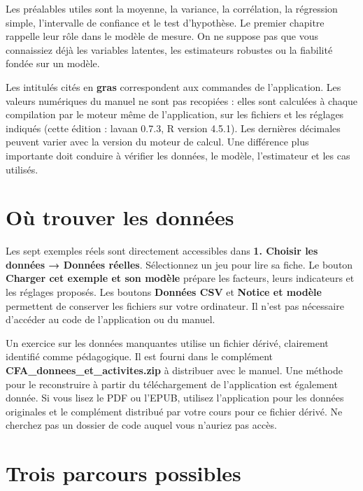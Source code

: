 \documentclass[
  french,
  11pt,
  a4paper,
  DIV=11,
  numbers=noendperiod]{scrreprt}
\begin{document}
Les préalables utiles sont la moyenne, la variance, la corrélation, la
régression simple, l'intervalle de confiance et le test d'hypothèse. Le
premier chapitre rappelle leur rôle dans le modèle de mesure. On ne
suppose pas que vous connaissiez déjà les variables latentes, les
estimateurs robustes ou la fiabilité fondée sur un modèle.

Les intitulés cités en \textbf{gras} correspondent aux commandes de
l'application. Les valeurs numériques du manuel ne sont pas recopiées :
elles sont calculées à chaque compilation par le moteur même de
l'application, sur les fichiers et les réglages indiqués (cette édition
: lavaan 0.7.3, R version 4.5.1). Les dernières décimales peuvent varier
avec la version du moteur de calcul. Une différence plus importante doit
conduire à vérifier les données, le modèle, l'estimateur et les cas
utilisés.

\section*{Où trouver les données}\label{ouxf9-trouver-les-donnuxe9es}


Les sept exemples réels sont directement accessibles dans \textbf{1.
Choisir les données → Données réelles}. Sélectionnez un jeu pour lire sa
fiche. Le bouton \textbf{Charger cet exemple et son modèle} prépare les
facteurs, leurs indicateurs et les réglages proposés. Les boutons
\textbf{Données CSV} et \textbf{Notice et modèle} permettent de
conserver les fichiers sur votre ordinateur. Il n'est pas nécessaire
d'accéder au code de l'application ou du manuel.

Un exercice sur les données manquantes utilise un fichier dérivé,
clairement identifié comme pédagogique. Il est fourni dans le complément
\textbf{CFA\_donnees\_et\_activites.zip} à distribuer avec le manuel.
Une méthode pour le reconstruire à partir du téléchargement de
l'application est également donnée. Si vous lisez le PDF ou l'EPUB,
utilisez l'application pour les données originales et le complément
distribué par votre cours pour ce fichier dérivé. Ne cherchez pas un
dossier de code auquel vous n'auriez pas accès.

\section*{Trois parcours possibles}\label{trois-parcours-possibles}
\end{document}
